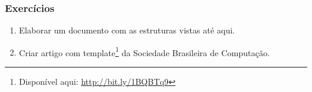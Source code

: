 \begin{frame}
\frametitle{Exercícios}


\begin{enumerate}
  \item Elaborar um documento com as estruturas vistas até aqui.
  \item Criar artigo com template\footnote{Disponível aqui: \url{http://bit.ly/1BQBTq9}} da
  Sociedade Brasileira de Computação.
\end{enumerate}
 
\end{frame}

